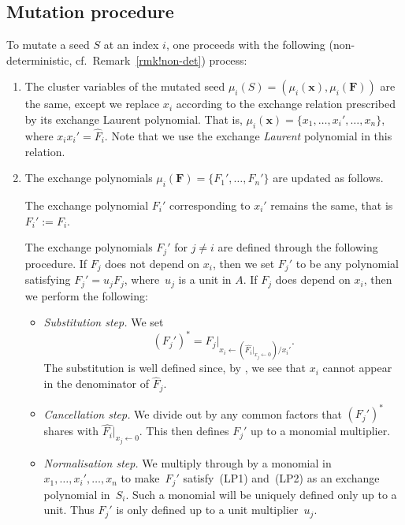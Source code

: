 \documentclass[pdftex]{sigma}
\numberwithin{equation}{section}
\theoremstyle{definition}
\begin{document}
\subsection{Mutation procedure}
To mutate a seed $S$ at an index $i$, one proceeds with the following (non-deterministic, cf.\ Remark~\ref{rmk!non-det}) process:
\begin{enumerate}\itemsep=0pt
 \item[(1)] The cluster variables of the mutated seed $\mu_i(S) = ( \mu_i(\bm{x}), \mu_i(\bm{F}) )$ are the same, except we replace $x_i$ according to the exchange relation prescribed by its exchange Laurent polynomial. That is, $\mu_i(\bm{x}) = \{x_1, \dots, x_i', \dots, x_n\}$, where $x_i x_i' = \hat{F}_i$.
 Note that we use the exchange \textit{Laurent} polynomial in this relation.
 \item[(2)] The exchange polynomials $\mu_i(\bm{F}) = \{F_1',\ldots,F_n'\}$ are updated as follows.

 The exchange polynomial $F_{i}'$ corresponding to $x_i'$ remains the same, that is $F_i' := F_i$.

 The exchange polynomials $F_j '$ for $j \neq i$ are defined through the following procedure. If $F_j$ does not depend on $x_i$, then we set $F_j '$ to be any polynomial satisfying $F_j ' = u_j F_j$, where~$u_j$ is a unit in $A$. If $F_j$ does depend on $x_i$, then we perform the following:
 \begin{itemize}\itemsep=0pt
 \item \textit{Substitution step.} We set
 \begin{equation*}
 ( F_j ' )^* = F_j |_{x_i \leftarrow (\hat{F_i} |_{x_{j} \leftarrow 0}) / x_i'}.
 			\end{equation*}
 The substitution is well defined since, by \cite[Lemma~2.7]{lp}, %
 we see that $x_i$ cannot appear in the denominator of $\hat{F}_{j}$.
 \item \textit{Cancellation step.} We divide out by any common factors that $(F_j ')^*$ shares with $\hat{F_i}|_{x_j \leftarrow 0}$. This then defines $F_j '$ up to a monomial multiplier.
 \item \textit{Normalisation step.} We multiply through by a monomial in $x_1, \dots, x_i', \dots, x_n$ to make~$F_j '$ satisfy~(LP1) and~(LP2) as an exchange polynomial in~$S_i$. Such a monomial will be uniquely defined only up to a unit. Thus $F_j '$ is only defined up to a unit multiplier~$u_j$.
 \end{itemize}
 \end{enumerate}
\end{document}
